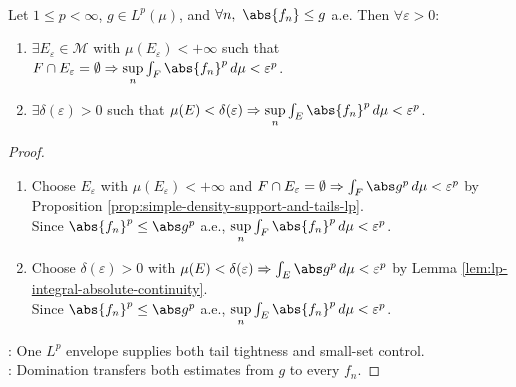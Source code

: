 \begin{corollary} \label{cor:domination-implies-vitali-side-conditions} \\
Let $1\leq p<\infty$, $g\in L^p(\mu)$, and $\forall n,\ \abs{f_n}\leq g$ a.e. Then $\forall\varepsilon>0$:
\begin{enumerate}[label=(\roman*)]
\setlength{\itemsep}{0pt}
\item $\exists E_\varepsilon\in\mathcal M$ with $\mu(E_\varepsilon)<+\infty$ such that $F\cap E_\varepsilon=\emptyset\Rightarrow\sup\limits_n\int_F\abs{f_n}^p\,d\mu<\varepsilon^p$.
\item $\exists\delta(\varepsilon)>0$ such that $\mu(E)<\delta(\varepsilon)\Rightarrow\sup\limits_n\int_E\abs{f_n}^p\,d\mu<\varepsilon^p$.
\end{enumerate}
\begin{proof}
\begin{enumerate}[label=(\roman*)]
\setlength{\itemsep}{0pt}
\item Choose $E_\varepsilon$ with $\mu(E_\varepsilon)<+\infty$ and $F\cap E_\varepsilon=\emptyset\Rightarrow\int_F\abs g^p\,d\mu<\varepsilon^p$ by Proposition \ref{prop:simple-density-support-and-tails-lp}.\\
Since $\abs{f_n}^p\leq\abs g^p$ a.e., $\sup\limits_n\int_F\abs{f_n}^p\,d\mu<\varepsilon^p$.
\item Choose $\delta(\varepsilon)>0$ with $\mu(E)<\delta(\varepsilon)\Rightarrow\int_E\abs g^p\,d\mu<\varepsilon^p$ by Lemma \ref{lem:lp-integral-absolute-continuity}.\\
Since $\abs{f_n}^p\leq\abs g^p$ a.e., $\sup\limits_n\int_E\abs{f_n}^p\,d\mu<\varepsilon^p$.
\end{enumerate}
: One $L^p$ envelope supplies both tail tightness and small-set control.\\
: Domination transfers both estimates from $g$ to every $f_n$.
\end{proof}
\end{corollary}
